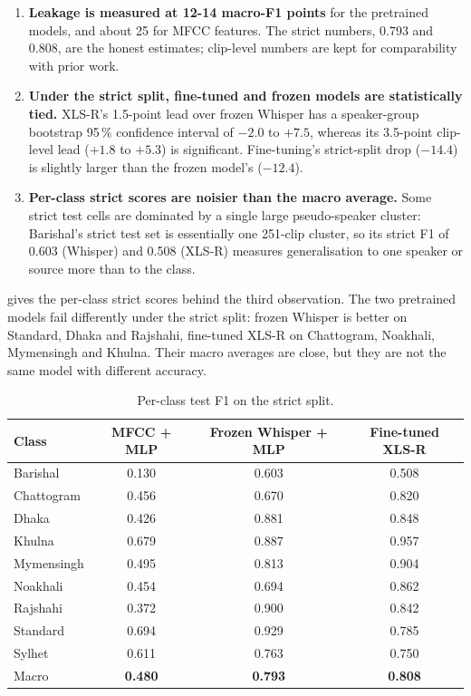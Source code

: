 \begin{enumerate}
  \item \textbf{Leakage is measured at 12-14 macro-F1 points} for the
        pretrained models, and about 25 for MFCC features. The strict numbers,
        0.793 and 0.808, are the honest estimates; clip-level numbers are kept
        for comparability with prior work.
  \item \textbf{Under the strict split, fine-tuned and frozen models are
        statistically tied.} XLS-R's 1.5-point lead over frozen Whisper has a
        speaker-group bootstrap 95\,\% confidence interval of $-2.0$ to $+7.5$,
        whereas its 3.5-point clip-level lead ($+1.8$ to $+5.3$) is significant.
        Fine-tuning's strict-split drop ($-14.4$) is slightly larger than the
        frozen model's ($-12.4$).
  \item \textbf{Per-class strict scores are noisier than the macro average.}
        Some strict test cells are dominated by a single large pseudo-speaker
        cluster: Barishal's strict test set is essentially one 251-clip
        cluster, so its strict F1 of 0.603 (Whisper) and 0.508 (XLS-R)
        measures generalisation to one speaker or source more than to the
        class.
\end{enumerate}

 gives the per-class strict scores behind the third
observation. The two pretrained models fail differently under the strict split:
frozen Whisper is better on Standard, Dhaka and Rajshahi, fine-tuned XLS-R on
Chattogram, Noakhali, Mymensingh and Khulna. Their macro averages are close,
but they are not the same model with different accuracy.

\begin{table}[ht]
  \centering
  \caption{Per-class test F1 on the strict split.}
  \label{tab:strict-perclass}
  \begin{tabular}{lccc}
    \toprule
    Class & MFCC + MLP & Frozen Whisper + MLP & Fine-tuned XLS-R \\
    \midrule
    Barishal   & 0.130 & 0.603 & 0.508 \\
    Chattogram & 0.456 & 0.670 & 0.820 \\
    Dhaka      & 0.426 & 0.881 & 0.848 \\
    Khulna     & 0.679 & 0.887 & 0.957 \\
    Mymensingh & 0.495 & 0.813 & 0.904 \\
    Noakhali   & 0.454 & 0.694 & 0.862 \\
    Rajshahi   & 0.372 & 0.900 & 0.842 \\
    Standard   & 0.694 & 0.929 & 0.785 \\
    Sylhet     & 0.611 & 0.763 & 0.750 \\
    \midrule
    Macro      & \textbf{0.480} & \textbf{0.793} & \textbf{0.808} \\
    \bottomrule
  \end{tabular}
\end{table}

